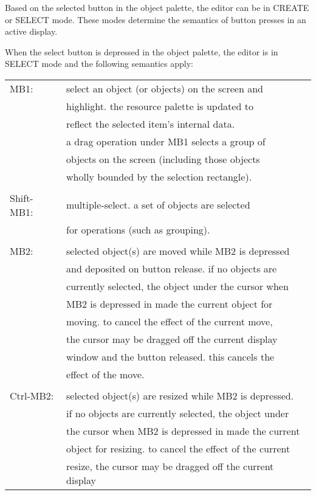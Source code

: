 Based on the selected button in the object palette, the editor can be
in CREATE or SELECT mode.  These modes determine the semantics of
button presses in an active display.

\newpage
\noindent When the select button is depressed in the object palette, the
editor is in SELECT mode and the following semantics apply:\\

\begin{tabular}{ll}
MB1: & select an object (or objects) on the screen and\\
     & highlight. the resource palette is updated to\\
     & reflect the selected item's internal data.\\
     & a drag operation under MB1 selects a group of\\
     & objects on the screen (including those objects\\
     & wholly bounded by the selection rectangle).\\
\\
Shift-MB1: & multiple-select.  a set of objects are selected \\
           & for operations (such as grouping).\\
\\
MB2: & selected object(s) are moved while MB2 is depressed \\
     & and deposited on button release.  if no objects are\\
     & currently selected, the object under the cursor when\\
     & MB2 is depressed in made the current object for \\
     & moving. to cancel the effect of the current move,\\
     & the cursor may be dragged off the current display\\
     & window and the button released.  this cancels the\\
     & effect of the move.\\
\\
Ctrl-MB2: & selected object(s) are resized while MB2 is depressed.\\
	  & if no objects are currently selected, the object under\\
	  & the cursor when MB2 is depressed in made the current\\
	  & object for resizing. to cancel the effect of the current\\
	  & resize, the cursor may be dragged off the current display\\

\end{tabular}
